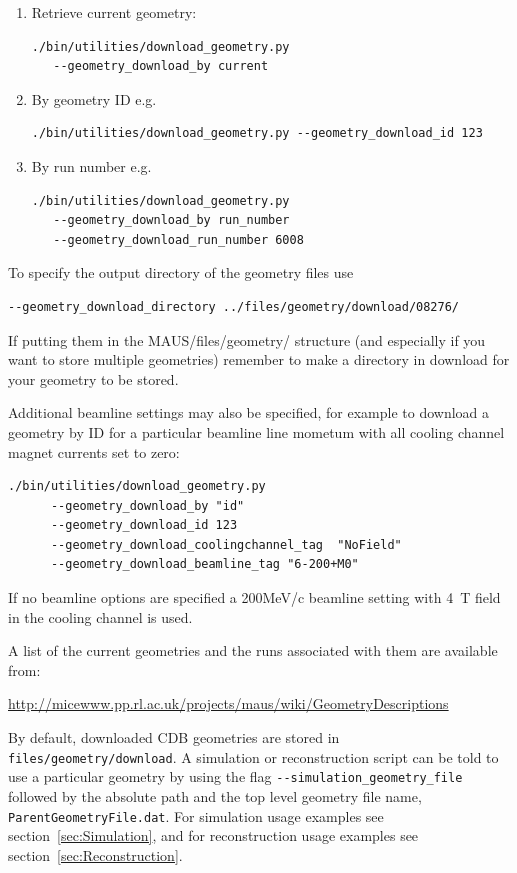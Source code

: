 \documentclass[a4paper,10pt]{article}
\begin{document}
\begin{enumerate}
  \item Retrieve current geometry:
  \begin{lstlisting}
./bin/utilities/download_geometry.py
   --geometry_download_by current
  \end{lstlisting}
  \item By geometry ID  e.g. 
    \begin{lstlisting}
./bin/utilities/download_geometry.py --geometry_download_id 123
    \end{lstlisting}
  \item By run number e.g.
  \begin{lstlisting}
./bin/utilities/download_geometry.py
   --geometry_download_by run_number
   --geometry_download_run_number 6008
  \end{lstlisting}
\end{enumerate}

To specify the output directory of the geometry files use
\begin{lstlisting}
--geometry_download_directory ../files/geometry/download/08276/
\end{lstlisting}

If putting them in the MAUS/files/geometry/ structure (and especially if you want to store multiple geometries) remember to make a directory in download for your geometry to be stored.

Additional beamline settings may also be specified, for example to download a geometry by ID for a particular beamline line mometum with all cooling channel magnet currents set to zero:

\begin{lstlisting}
./bin/utilities/download_geometry.py 
      --geometry_download_by "id" 
      --geometry_download_id 123
      --geometry_download_coolingchannel_tag  "NoField" 
      --geometry_download_beamline_tag "6-200+M0" 
\end{lstlisting}

If no beamline options are specified a 200MeV/c beamline setting with 4~T field in the cooling channel is used.

A list of the current geometries and the runs associated with them are available from:

    \medskip
    \url{http://micewww.pp.rl.ac.uk/projects/maus/wiki/GeometryDescriptions}
    \medskip

By default, downloaded CDB geometries are stored in \texttt{files/geometry/download}.  A simulation or reconstruction script can be told to use a particular geometry by using the flag \texttt{-{}-simulation\_geometry\_file} followed by the absolute path and the top level geometry file name, \texttt{ParentGeometryFile.dat}. For simulation usage examples see section~\ref{sec:Simulation}, and for reconstruction usage examples see section~\ref{sec:Reconstruction}.
\end{document}
